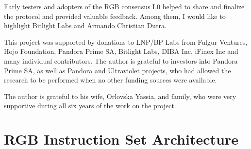 \documentclass[9pt,oneside]{amsart}
\begin{document}
\begin{multicols}{2}
Early testers and adopters of the RGB consensus I.0 helped to share and finalize the protocol
and provided valuable feedback.
Among them, I would like to highlight Bitlight Labs and Armando Christian Dutra.

This project was supported by donations to LNP/BP Labs from Fulgur Ventures, Hojo Foundation,
Pandora Prime SA, Bitlight Labs, DIBA Inc, iFinex Inc and many individual contributors.
The author is grateful to investors into Pandora Prime SA,
as well as Pandora and Ultraviolet projects,
who had allowed the research to be performed when no other funding sources were available.

The author is grateful to his wife, Orlovska Yassia, and family,
who were very supportive during all six years of the work on the project.




\end{multicols}

\newpage

\appendix
\section{RGB Instruction Set Architecture}\label{ap:ISA}
\end{document}
